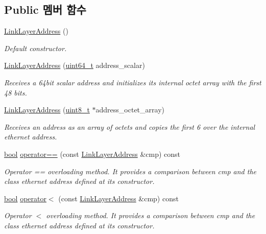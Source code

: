 \subsection*{Public 멤버 함수}
\begin{DoxyCompactItemize}
\item 
\hyperlink{class_link_layer_address_aca944d384344a5b52cfa2eb22cde6c98}{Link\+Layer\+Address} ()
\begin{DoxyCompactList}\small\item\em Default constructor. \end{DoxyCompactList}\item 
\hyperlink{class_link_layer_address_af64c0057e25f9d1a2303002b1fe8cf3f}{Link\+Layer\+Address} (\hyperlink{parse_8c_aec6fcb673ff035718c238c8c9d544c47}{uint64\+\_\+t} address\+\_\+scalar)
\begin{DoxyCompactList}\small\item\em Receives a 64bit scalar address and initializes its internal octet array with the first 48 bits. \end{DoxyCompactList}\item 
\hyperlink{class_link_layer_address_af6ba66da36cf03a29ac35d97a01675be}{Link\+Layer\+Address} (\hyperlink{stdint_8h_aba7bc1797add20fe3efdf37ced1182c5}{uint8\+\_\+t} $\ast$address\+\_\+octet\+\_\+array)
\begin{DoxyCompactList}\small\item\em Receives an address as an array of octets and copies the first 6 over the internal ethernet address. \end{DoxyCompactList}\item 
\hyperlink{avb__gptp_8h_af6a258d8f3ee5206d682d799316314b1}{bool} \hyperlink{class_link_layer_address_a7c2597c96046850933a95613b20b6379}{operator==} (const \hyperlink{class_link_layer_address}{Link\+Layer\+Address} \&cmp) const 
\begin{DoxyCompactList}\small\item\em Operator \textquotesingle{}==\textquotesingle{} overloading method. It provides a comparison between cmp and the class ethernet address defined at its constructor. \end{DoxyCompactList}\item 
\hyperlink{avb__gptp_8h_af6a258d8f3ee5206d682d799316314b1}{bool} \hyperlink{class_link_layer_address_aaf47e5402d7a2954ec18a6ab2ddfdfc5}{operator$<$} (const \hyperlink{class_link_layer_address}{Link\+Layer\+Address} \&cmp) const 
\begin{DoxyCompactList}\small\item\em Operator \textquotesingle{}$<$\textquotesingle{} overloading method. It provides a comparison between cmp and the class ethernet address defined at its constructor. \end{DoxyCompactList}\item 

\end{DoxyCompactItemize}
